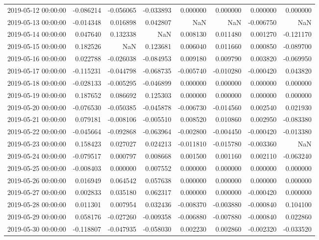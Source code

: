 \begin{tabular}{lrrrrrrr}
2019-05-12 00:00:00 & -0.086214 & -0.056065 & -0.033893 & 0.000000 & 0.000000 & 0.000000 & 0.000000 \\
2019-05-13 00:00:00 & -0.014348 & 0.016898 & 0.042807 & NaN & NaN & -0.006750 & NaN \\
2019-05-14 00:00:00 & 0.047640 & 0.132338 & NaN & 0.008130 & 0.011480 & 0.001270 & -0.121170 \\
2019-05-15 00:00:00 & 0.182526 & NaN & 0.123681 & 0.006040 & 0.011660 & 0.000850 & -0.089700 \\
2019-05-16 00:00:00 & 0.022788 & -0.026038 & -0.084953 & 0.009180 & 0.009790 & 0.003820 & -0.069950 \\
2019-05-17 00:00:00 & -0.115231 & -0.044798 & -0.068735 & -0.005740 & -0.010280 & -0.000420 & 0.043820 \\
2019-05-18 00:00:00 & -0.028133 & -0.005295 & -0.046899 & 0.000000 & 0.000000 & 0.000000 & 0.000000 \\
2019-05-19 00:00:00 & 0.187652 & 0.086692 & 0.125303 & 0.000000 & 0.000000 & 0.000000 & 0.000000 \\
2019-05-20 00:00:00 & -0.076530 & -0.050385 & -0.045878 & -0.006730 & -0.014560 & 0.002540 & 0.021930 \\
2019-05-21 00:00:00 & 0.079181 & -0.008106 & -0.005510 & 0.008520 & 0.010860 & 0.002950 & -0.083380 \\
2019-05-22 00:00:00 & -0.045664 & -0.092868 & -0.063964 & -0.002800 & -0.004450 & -0.000420 & -0.013380 \\
2019-05-23 00:00:00 & 0.158423 & 0.027027 & 0.024213 & -0.011810 & -0.015780 & -0.003360 & NaN \\
2019-05-24 00:00:00 & -0.079517 & 0.000797 & 0.008668 & 0.001500 & 0.001160 & 0.002110 & -0.063240 \\
2019-05-25 00:00:00 & -0.008403 & 0.000000 & 0.007552 & 0.000000 & 0.000000 & 0.000000 & 0.000000 \\
2019-05-26 00:00:00 & 0.016949 & 0.064542 & 0.057638 & 0.000000 & 0.000000 & 0.000000 & 0.000000 \\
2019-05-27 00:00:00 & 0.002833 & 0.035180 & 0.062317 & 0.000000 & 0.000000 & -0.000420 & 0.000000 \\
2019-05-28 00:00:00 & 0.011301 & 0.007954 & 0.032436 & -0.008370 & -0.003880 & -0.000840 & 0.104100 \\
2019-05-29 00:00:00 & 0.058176 & -0.027260 & -0.009358 & -0.006880 & -0.007880 & -0.000840 & 0.022860 \\
2019-05-30 00:00:00 & -0.118807 & -0.047935 & -0.058030 & 0.002230 & 0.002860 & -0.002320 & -0.033520 \\

\end{tabular}
